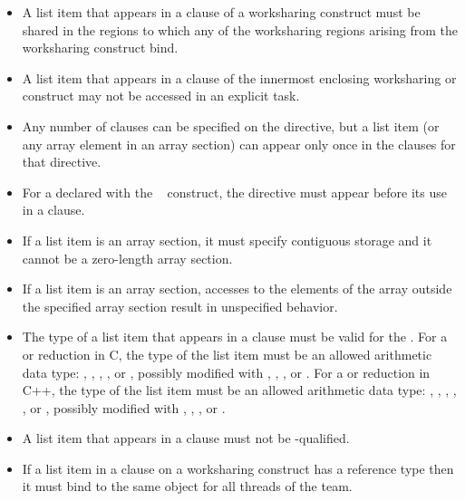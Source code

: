 {{{{\begin{itemize}
\item A list item that appears in a  clause of a worksharing construct must be 
shared in the  regions to which any of the worksharing regions arising 
from the worksharing construct bind.

\item A list item that appears in a  clause of the innermost enclosing 
worksharing or  construct may not be accessed in an explicit task.

\item Any number of  clauses can be specified on the
  directive, but a list item (or any array element in an array
  section) can appear only once in the  clauses for
  that directive.

\item For a  declared with the ~ construct, the 
directive must appear before its use in a  clause.

\item 
If a list item is an array section, it must specify contiguous storage and it cannot be a zero-length array section.

\item If a list item is an array section, accesses to the elements of the array outside the specified array section result in unspecified behavior.

\ccppspecificstart
\item The type of a list item that appears in a  clause must be valid for the 
. For a  or  reduction in C, the type of the list item must 
be an allowed arithmetic data type: , , , , or , 
possibly modified with , , , or . For a  or  
reduction in C++, the type of the list item must be an allowed arithmetic data type: 
, , , , , or , possibly modified with , 
, , or .

\item A list item that appears in a  clause must not be -qualified.

\item If a list item in a  clause on a worksharing
construct has a reference type then it must bind to the same object for all threads of the team.


\end{itemize}}}}}
